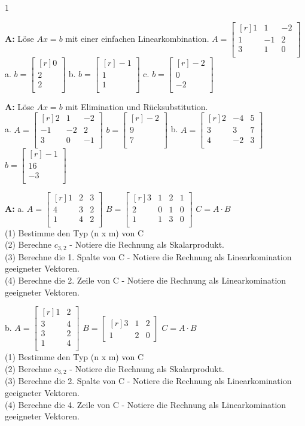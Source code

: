 \documentclass[landscape,twocolumn,a4paper]{article}
\newcommand{\matrixdd}[9]{\ensuremath{\begin{bmatrix*}[r] #1 & #2 & #3 \\  #4 & #5 & #6\\ #7 & #8 & #9 \\ \end{bmatrix*}}}
\newcommand{\vectord}[3]{\ensuremath{\begin{bmatrix*}[r] #1 \\#2 \\#3 \\ \end{bmatrix*}}}
\begin{document}
\setcounter {y} {1}
\parindent 0mm
\bigskip
 
\textbf{A:}   
Löse $Ax = b$ mit einer einfachen Linearkombination.
$A =\matrixdd{1}{1}{-2}{1}{-1}{2}{3}{1}{0}$\\

a.  $b = \vectord{0}{2}{2}$ \quad b. $b = \vectord{-1}{1}{1}$ \quad c. $ b = \vectord{-2}{0}{-2}$ 
\bigskip {}

\textbf{A:}   
Löse $Ax = b$ mit Elimination und Rücksubstitution. \\

a.  $A =\matrixdd{2}{1}{-2}{-1}{-2}{2}{3}{0}{-1}$ \quad $b = \vectord{-2}{9}{7}$  \quad
b.  $A =\matrixdd{2}{-4}{5}{3}{3}{7}{4}{-2}{3}$ \quad $b = \vectord{-1}{16}{-3}$ 
\bigskip {}

\textbf{A:}   
a.
$A =\matrixdd{1}{2}{3}{4}{3}{2}{1}{4}{2}$  \quad
 $B =\begin{bmatrix*}[r] 3 & 1 & 2 & 1\\  2 & 0 & 1 & 0\\ 1 & 1 & 3 & 0\\ \end{bmatrix*}$  \quad
 $C = A \cdot B$  \\ 
 (1) Bestimme den Typ (n x m) von C \\
 (2) Berechne $c_{3,2}$ - Notiere die Rechnung als Skalarprodukt.\\
 (3) Berechne die 1. Spalte von C  - Notiere die Rechnung als Linearkomination geeigneter Vektoren. \\
 (4) Berechne die 2. Zeile von C  - Notiere die Rechnung als Linearkomination geeigneter Vektoren. 

 \vspace{10pt}
 
 b.
$A =\begin{bmatrix*}[r] 1 & 2\\  3 & 4 \\  3 & 2\\ 1 & 4 \\ \end{bmatrix*}$  \quad
 $B =\begin{bmatrix*}[r] 3 & 1 & 2 \\  1 & 2 &  0 \end{bmatrix*}$  \quad
 $C = A \cdot B$   \\
 (1) Bestimme den Typ (n x m) von C \\
 (2) Berechne $c_{3,2}$ - Notiere die Rechnung als Skalarprodukt.\\
 (3) Berechne die 2. Spalte von C  - Notiere die Rechnung als Linearkomination geeigneter Vektoren. \\
 (4) Berechne die 4. Zeile von C  - Notiere die Rechnung als Linearkomination geeigneter Vektoren. 
\end{document}

